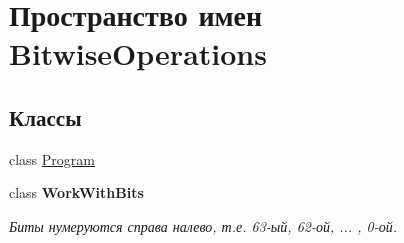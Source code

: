 \hypertarget{namespace_bitwise_operations}{}\section{Пространство имен Bitwise\+Operations}
\label{namespace_bitwise_operations}
\subsection*{Классы}
\begin{DoxyCompactItemize}
\item 
class \mbox{\hyperlink{class_bitwise_operations_1_1_program}{Program}}
\item 
class {\bfseries Work\+With\+Bits}
\begin{DoxyCompactList}\small\item\em Биты нумеруются справа налево, т.\+е. 63-\/ый, 62-\/ой, ... , 0-\/ой. \end{DoxyCompactList}\end{DoxyCompactItemize}
